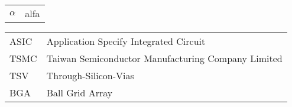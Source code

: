 \begin{tabular}{ l  l }
	
	$\alpha$ 			& alfa 				\\
	
\end{tabular}

\begin{tabular}{ l  l }
	
	ASIC & Application Specify Integrated Circuit \\
	TSMC & Taiwan Semiconductor Manufacturing Company Limited \\ 
	TSV	 & Through-Silicon-Vias \\
	BGA & Ball Grid Array \\
	
		
\end{tabular}